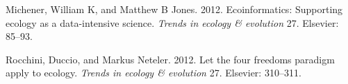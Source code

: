 \documentclass[
]{article}
\newlength{\cslhangindent}
\newenvironment{cslreferences}%
  {\setlength{\parindent}{0pt}%
  \everypar{\setlength{\hangindent}{\cslhangindent}}\ignorespaces}%
  {\par}
\begin{document}
\begin{cslreferences}
\leavevmode\hypertarget{ref-michener2012}{}%
Michener, William K, and Matthew B Jones. 2012. Ecoinformatics:
Supporting ecology as a data-intensive science. \emph{Trends in ecology
\& evolution} 27. Elsevier: 85--93.

\leavevmode\hypertarget{ref-rocchini2012}{}%
Rocchini, Duccio, and Markus Neteler. 2012. Let the four freedoms
paradigm apply to ecology. \emph{Trends in ecology \& evolution} 27.
Elsevier: 310--311.
\end{cslreferences}
\end{document}
